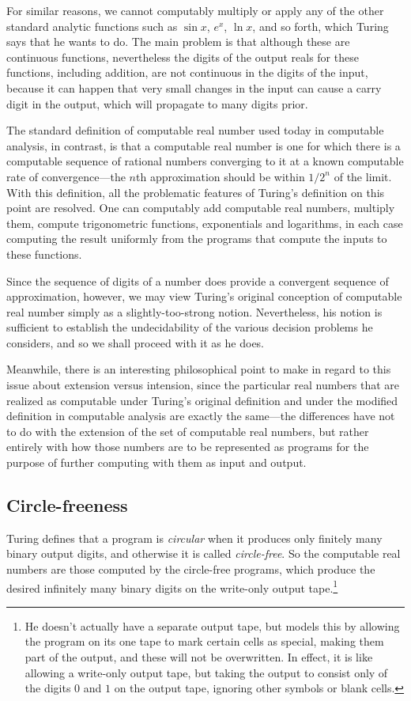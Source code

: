 \documentclass{amsart}
\begin{document}
For similar reasons, we cannot computably multiply or apply any of the other standard analytic functions such as $\sin x$, $e^x$, $\ln x$, and so forth, which Turing says that he wants to do. The main problem is that although these are continuous functions, nevertheless the digits of the output reals for these functions, including addition, are not continuous in the digits of the input, because it can happen that very small changes in the input can cause a carry digit in the output, which will propagate to many digits prior.

The standard definition of computable real number used today in computable analysis, in contrast, is that a computable real number is one for which there is a computable sequence of rational numbers converging to it at a known computable rate of convergence---the $n$th approximation should be within $1/2^n$ of the limit. With this definition, all the problematic features of Turing's definition on this point are resolved. One can computably add computable real numbers, multiply them, compute trigonometric functions, exponentials and logarithms, in each case computing the result uniformly from the programs that compute the inputs to these functions.

Since the sequence of digits of a number does provide a convergent sequence of approximation, however, we may view Turing's original conception of computable real number simply as a slightly-too-strong notion. Nevertheless, his notion is sufficient to establish the undecidability of the various decision problems he considers, and so we shall proceed with it as he does.

Meanwhile, there is an interesting philosophical point to make in regard to this issue about extension versus intension, since the particular real numbers that are realized as computable under Turing's original definition and under the modified definition in computable analysis are exactly the same---the differences have not to do with the extension of the set of computable real numbers, but rather entirely with how those numbers are to be represented as programs for the purpose of further computing with them as input and output.

\subsection{Circle-freeness}

Turing defines that a program is \emph{circular} when it produces only finitely many binary output digits, and otherwise it is called \emph{circle-free}. So the computable real numbers are those computed by the circle-free programs, which produce the desired infinitely many binary digits on the write-only output tape.\footnote{He doesn't actually have a separate output tape, but models this by allowing the program on its one tape to mark certain cells as special, making them part of the output, and these will not be overwritten. In effect, it is like allowing a write-only output tape, but taking the output to consist only of the digits $0$ and $1$ on the output tape, ignoring other symbols or blank cells.}
\end{document}
